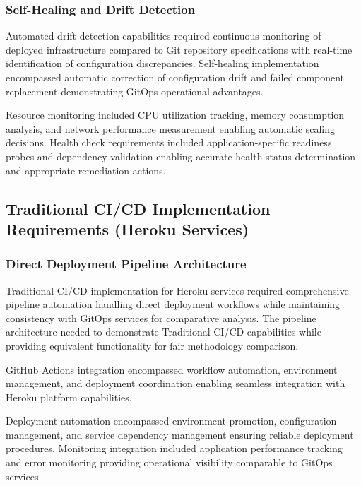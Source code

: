 \subsubsection{Self-Healing and Drift Detection}
Automated drift detection capabilities required continuous monitoring of deployed infrastructure compared to Git repository specifications with real-time identification of configuration discrepancies. Self-healing implementation encompassed automatic correction of configuration drift and failed component replacement demonstrating GitOps operational advantages.

Resource monitoring included CPU utilization tracking, memory consumption analysis, and network performance measurement enabling automatic scaling decisions. Health check requirements included application-specific readiness probes and dependency validation enabling accurate health status determination and appropriate remediation actions.

\subsection{Traditional CI/CD Implementation Requirements (Heroku Services)}

\subsubsection{Direct Deployment Pipeline Architecture}
Traditional CI/CD implementation for Heroku services required comprehensive pipeline automation handling direct deployment workflows while maintaining consistency with GitOps services for comparative analysis. The pipeline architecture needed to demonstrate Traditional CI/CD capabilities while providing equivalent functionality for fair methodology comparison.

GitHub Actions integration \cite{github_actions2023} encompassed workflow automation, environment management, and deployment coordination enabling seamless integration with Heroku platform capabilities.


Deployment automation encompassed environment promotion, configuration management, and service dependency management ensuring reliable deployment procedures. Monitoring integration included application performance tracking and error monitoring providing operational visibility comparable to GitOps services.

